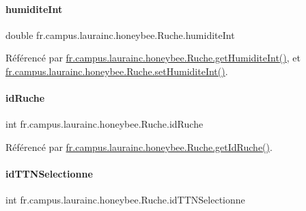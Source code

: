 \paragraph{\texorpdfstring{humidite\+Int}{humiditeInt}}
{\footnotesize\ttfamily double fr.\+campus.\+laurainc.\+honeybee.\+Ruche.\+humidite\+Int\hspace{0.3cm}{\ttfamily [private]}}



Référencé par \hyperlink{classfr_1_1campus_1_1laurainc_1_1honeybee_1_1_ruche_ab4f2b99dbdcb4cfcb81827f294ffeb4a}{fr.\+campus.\+laurainc.\+honeybee.\+Ruche.\+get\+Humidite\+Int()}, et \hyperlink{classfr_1_1campus_1_1laurainc_1_1honeybee_1_1_ruche_a1a5bbd259b54c895833c9e3710d2eead}{fr.\+campus.\+laurainc.\+honeybee.\+Ruche.\+set\+Humidite\+Int()}.

\mbox{\label{classfr_1_1campus_1_1laurainc_1_1honeybee_1_1_ruche_aee4d51dd1634b799427d89e168cdadf4}} 
\paragraph{\texorpdfstring{id\+Ruche}{idRuche}}
{\footnotesize\ttfamily int fr.\+campus.\+laurainc.\+honeybee.\+Ruche.\+id\+Ruche\hspace{0.3cm}{\ttfamily [private]}}



Référencé par \hyperlink{classfr_1_1campus_1_1laurainc_1_1honeybee_1_1_ruche_ace3993bb5f36dc8c63f18bcc3ac75adf}{fr.\+campus.\+laurainc.\+honeybee.\+Ruche.\+get\+Id\+Ruche()}.

\mbox{\label{classfr_1_1campus_1_1laurainc_1_1honeybee_1_1_ruche_a4f7b012e98299ef15fbce3b60930fefb}} 
\paragraph{\texorpdfstring{id\+T\+T\+N\+Selectionne}{idTTNSelectionne}}
{\footnotesize\ttfamily int fr.\+campus.\+laurainc.\+honeybee.\+Ruche.\+id\+T\+T\+N\+Selectionne\hspace{0.3cm}{\ttfamily [private]}}



